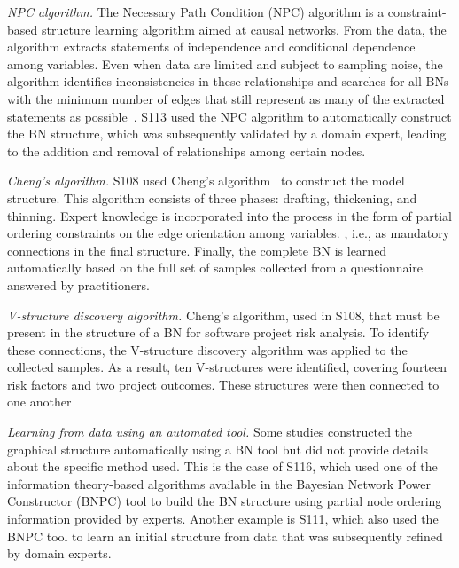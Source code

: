 \textit{NPC algorithm.} The Necessary Path Condition (NPC) algorithm is a constraint-based structure learning algorithm aimed at causal networks. From the data, the algorithm extracts statements of independence and conditional dependence among variables. Even when data are limited and subject to sampling noise, the algorithm identifies inconsistencies in these relationships and searches for all BNs with the minimum number of edges that still represent as many of the extracted statements as possible~\cite{steck1999bayesian}. S113 used the NPC algorithm to automatically construct the BN structure, which was subsequently validated by a domain expert, leading to the addition and removal of relationships among certain nodes.

\textit{Cheng's algorithm.} S108 used Cheng's algorithm~\cite{cheng2002learning} to construct the model structure. This algorithm consists of three phases: drafting, thickening, and thinning. Expert knowledge is incorporated into the process in the form of partial ordering constraints on the edge orientation among variables. , i.e., as mandatory connections in the final structure. Finally, the complete BN is learned automatically based on the full set of samples collected from a questionnaire answered by practitioners.

\textit{V-structure discovery algorithm.} Cheng's algorithm, used in S108,  that must be present in the structure of a BN for software project risk analysis. To identify these connections, the V-structure discovery algorithm was applied to the collected samples. As a result, ten V-structures were identified, covering fourteen risk factors and two project outcomes. These structures were then connected to one another 

\textit{Learning from data using an automated tool.} Some studies constructed the graphical structure automatically using a BN tool but did not provide details about the specific method used. This is the case of S116, which used one of the information theory-based algorithms available in the Bayesian Network Power Constructor (BNPC) tool to build the BN structure using partial node ordering information provided by experts. Another example is S111, which also used the BNPC tool to learn an initial structure from data that was subsequently refined by domain experts.


